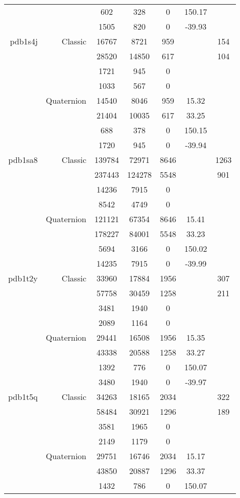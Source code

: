 \begin{xltabular}{\textwidth}{r|rcccSc}
& & 602 & 328 & 0 & 150.17 & \\
& & 1505 & 820 & 0 & -39.93 & \\ \addlinespace
pdb1s4j & Classic & 16767 & 8721 & 959 & & 154 \\
& & 28520 & 14850 & 617 & & 104 \\
& & 1721 & 945 & 0 & & \\
& & 1033 & 567 & 0 & & \\
& Quaternion & 14540 & 8046 & 959 & 15.32 & \\
& & 21404 & 10035 & 617 & 33.25 & \\
& & 688 & 378 & 0 & 150.15 & \\
& & 1720 & 945 & 0 & -39.94 & \\ \addlinespace
pdb1sa8 & Classic & 139784 & 72971 & 8646 & & 1263 \\
& & 237443 & 124278 & 5548 & & 901 \\
& & 14236 & 7915 & 0 & & \\
& & 8542 & 4749 & 0 & & \\
& Quaternion & 121121 & 67354 & 8646 & 15.41 & \\
& & 178227 & 84001 & 5548 & 33.23 & \\
& & 5694 & 3166 & 0 & 150.02 & \\
& & 14235 & 7915 & 0 & -39.99 & \\ \addlinespace
pdb1t2y & Classic & 33960 & 17884 & 1956 & & 307 \\
& & 57758 & 30459 & 1258 & & 211 \\
& & 3481 & 1940 & 0 & & \\
& & 2089 & 1164 & 0 & & \\
& Quaternion & 29441 & 16508 & 1956 & 15.35 & \\
& & 43338 & 20588 & 1258 & 33.27 & \\
& & 1392 & 776 & 0 & 150.07 & \\
& & 3480 & 1940 & 0 & -39.97 & \\ \addlinespace
pdb1t5q & Classic & 34263 & 18165 & 2034 & & 322 \\
& & 58484 & 30921 & 1296 & & 189 \\
& & 3581 & 1965 & 0 & & \\
& & 2149 & 1179 & 0 & & \\
& Quaternion & 29751 & 16746 & 2034 & 15.17 & \\
& & 43850 & 20887 & 1296 & 33.37 & \\
& & 1432 & 786 & 0 & 150.07 & \\

\end{xltabular}
